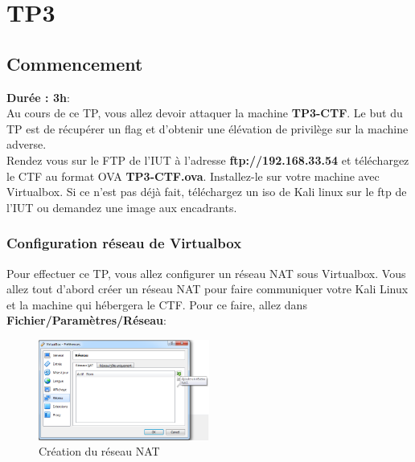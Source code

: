 \section{TP3}
\label{chap:Mini Projet}

\subsection{Commencement}

\noindent \textbf{Durée : 3h}: \\
\noindent Au cours de ce TP, vous allez devoir attaquer la machine \textbf{TP3-CTF}. Le but du TP est de récupérer un flag et d'obtenir une élévation de privilège sur la machine adverse.\\

\noindent Rendez vous sur le FTP de l'IUT à l'adresse \textbf{ftp://192.168.33.54} et téléchargez le CTF au format OVA \textbf{TP3-CTF.ova}. Installez-le sur votre machine avec Virtualbox. Si ce n'est pas déjà fait, téléchargez un iso de Kali linux sur le ftp de l'IUT ou demandez une image aux encadrants.

\subsubsection{Configuration réseau de Virtualbox}

Pour effectuer ce TP, vous allez configurer un réseau NAT sous Virtualbox. Vous allez tout d'abord créer un réseau NAT pour faire communiquer votre Kali Linux et la machine qui hébergera le CTF. Pour ce faire, allez dans \textbf{Fichier/Paramètres/Réseau}:

\begin{figure}[htp!]
  \centering
  \setlength\figureheight{7cm}
  \setlength\figurewidth{9cm}
  \includegraphics[width=0.5\textwidth]{oui/TP3/imageCTF.png}
  \caption{Création du réseau NAT}
  \label{fig:courbe-tikz}
\end{figure}

